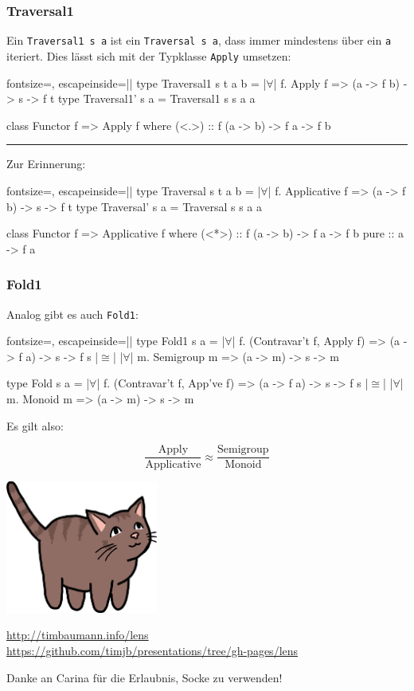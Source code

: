 \documentclass{beamer}
\newcommand{\fa}{$\forall$}
\begin{document}
\begin{frame}[fragile]
  \frametitle{Traversal1}
  Ein \verb|Traversal1 s a| ist ein \verb|Traversal s a|, dass immer mindestens über ein \verb|a| iteriert.
  Dies lässt sich mit der Typklasse \verb|Apply| umsetzen:
  \begin{haskellcode*}{fontsize=\footnotesize, escapeinside=||}
type Traversal1 s t a b = |\fa| f. Apply f => (a -> f b) -> s -> f t
type Traversal1' s a = Traversal1 s s a a

class Functor f => Apply f where
  (<.>) :: f (a -> b) -> f a -> f b
  \end{haskellcode*}

  \noindent\rule{\textwidth}{0.4pt}

  Zur Erinnerung:
  \begin{haskellcode*}{fontsize=\footnotesize, escapeinside=||}
type Traversal s t a b = |\fa| f. Applicative f => (a -> f b) -> s -> f t
type Traversal' s a = Traversal s s a a

class Functor f => Applicative f where
  (<*>) :: f (a -> b) -> f a -> f b
  pure :: a -> f a
  \end{haskellcode*}
\end{frame}

\begin{frame}[fragile]
  \frametitle{Fold1}
  Analog gibt es auch \verb|Fold1|:
  \begin{haskellcode*}{fontsize=\footnotesize, escapeinside=||}
type Fold1 s a = |\fa| f. (Contravar't f, Apply  f) => (a -> f a) -> s -> f s
               |$\cong$| |\fa| m. Semigroup m => (a -> m) -> s -> m

type Fold  s a = |\fa| f. (Contravar't f, App've f) => (a -> f a) -> s -> f s
               |$\cong$| |\fa| m. Monoid m => (a -> m) -> s -> m
  \end{haskellcode*}

  Es gilt also:

  \[ \frac{\text{Apply}}{\text{Applicative}} \approx \frac{\text{Semigroup}}{\text{Monoid}} \]
\end{frame}

{
\begin{frame}[b]
  \begin{center}
    \includegraphics[width=5cm,keepaspectratio]{images/socke-gross.png} \\
  \end{center}

  \centering \small
  \url{http://timbaumann.info/lens} \\
  \url{https://github.com/timjb/presentations/tree/gh-pages/lens}

  Danke an Carina für die Erlaubnis, Socke zu verwenden!
\end{frame}}
\end{document}

